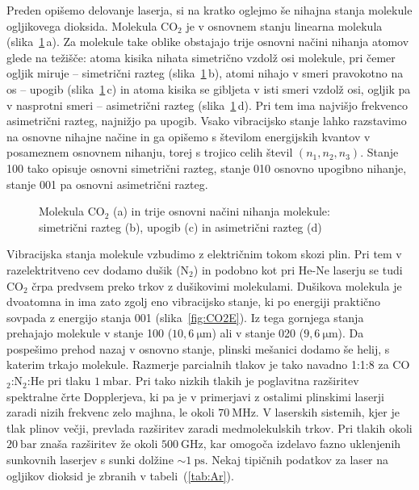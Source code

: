 Preden opišemo delovanje laserja, si na kratko oglejmo še nihajna stanja molekule 
ogljikovega dioksida. Molekula CO$_2$ je v osnovnem stanju linearna molekula 
(slika~\ref{fig:CO2}\,a). 
Za molekule take oblike obstajajo trije osnovni načini nihanja atomov glede na težišče:
atoma kisika nihata simetrično vzdolž osi molekule, pri čemer ogljik miruje --
simetrični razteg (slika~\ref{fig:CO2}\,b), atomi nihajo v smeri pravokotno na 
os -- upogib (slika~\ref{fig:CO2}\,c) in atoma kisika se gibljeta v isti smeri 
vzdolž osi, ogljik pa v nasprotni smeri -- asimetrični razteg (slika~\ref{fig:CO2}\,d). 
Pri tem ima najvišjo frekvenco asimetrični razteg, najnižjo pa upogib. 
Vsako vibracijsko stanje lahko razstavimo na osnovne nihajne načine in 
ga opišemo s številom energijskih kvantov v posameznem osnovnem nihanju, 
torej s trojico celih števil $(n_1,n_2,n_3)$. Stanje 100 tako opisuje
osnovni simetrični razteg, stanje 010 osnovno upogibno nihanje, stanje 001 pa 
osnovni asimetrični razteg.

\begin{figure}[h]
\centering
\def\svgwidth{100truemm} 

\caption{Molekula CO$_2$ (a) in trije osnovni načini nihanja molekule:
simetrični razteg (b), upogib (c) in asimetrični razteg (d)}
\label{fig:CO2}
\end{figure}

Vibracijska stanja molekule vzbudimo z električnim tokom skozi plin. 
Pri tem v razelektritveno cev dodamo dušik (N$_2$) in podobno kot pri He-Ne laserju
se tudi CO$_2$ črpa predvsem preko trkov z dušikovimi molekulami. 
Dušikova molekula je dvoatomna in ima zato zgolj eno vibracijsko stanje, ki po energiji
praktično sovpada z energijo stanja 001 (slika~\ref{fig:CO2E}). Iz tega gornjega
stanja prehajajo molekule v stanje 100 ($10,6~\si{\micro\metre}$) ali v stanje
020 ($9,6~\si{\micro\metre}$). Da pospešimo prehod nazaj v osnovno stanje, 
plinski mešanici dodamo še helij, s katerim trkajo molekule.
Razmerje parcialnih tlakov je tako navadno 1:1:8 za CO$_2$:N$_2$:He pri tlaku $1~\si{\milli\bar}$. 
Pri tako nizkih tlakih je poglavitna razširitev spektralne črte Dopplerjeva, 
ki 
pa je v primerjavi z ostalimi plinskimi laserji zaradi nizih frekvenc zelo majhna,
le okoli $70~\si{\mega\hertz}$. V laserskih sistemih, kjer je tlak plinov večji,
prevlada razširitev zaradi medmolekulskih trkov. Pri tlakih okoli $20~\si{\bar}$
znaša razširitev že okoli $500~\si{\giga\hertz}$, kar omogoča izdelavo fazno uklenjenih 
sunkovnih laserjev s sunki dolžine $\sim 1~\si{\pico\second}$. Nekaj tipičnih podatkov 
za laser na ogljikov dioksid je zbranih v tabeli~(\ref{tab:Ar}).

